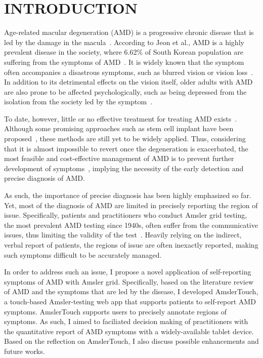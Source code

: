 \chapter{INTRODUCTION}

Age-related macular degeneration (AMD) is a progressive chronic disease that is led by the damage in the macula~\cite{lim2012age}. According to Jeon et al., AMD is a highly prevalent disease in the society, where 6.62\% of South Korean population are suffering from the symptoms of AMD~\cite{park2014age}. It is widely known that the symptom often accompanies a disastrous symptoms, such as blurred vision or vision loss~\cite{lim2012age}. In addition to its detrimental effects on the vision itself, older adults with AMD are also prone to be affected psychologically, such as being depressed from the isolation from the society led by the symptom~\cite{rovner2007preventing}.

To date, however, little or no effective treatment for treating AMD exists~\cite{wong2011prevention}. Although some promising approaches such as stem cell implant have been proposed~\cite{carr2013development}, these methods are still yet to be widely applied. Thus, considering that it is almost impossible to revert once the degeneration is exacerbated, the most feasible and cost-effective management of AMD is to prevent further development of symptoms~\cite{al2017recent}, implying the necessity of the early detection and precise diagnosis of AMD.

As such, the importance of precise diagnosis has been highly emphasized so far. Yet, most of the diagnosis of AMD are limited in precisely reporting the region of issue. Specifically, patients and practitioners who conduct Amsler grid testing, the most prevalent AMD testing since 1940s, often suffer from the communicative issues, thus limiting the validity of the test~\cite{schuchard1993validity}. Heavily relying on the indirect, verbal report of patients, the regions of issue are often inexactly reported, making such symptoms difficult to be accurately managed.

In order to address such an issue, I propose a novel application of self-reporting symptoms of AMD with Amsler grid. Specifically, based on the literature review of AMD and the symptoms that are led by the disease, I developed AmslerTouch, a touch-based Amsler-testing web app that supports patients to self-report AMD symptoms. AmslerTouch supports users to precisely annotate regions of symptoms. As such, I aimed to faciliated decision making of practitioners with the quantitative report of AMD symptoms with a widely-available tablet device. Based on the reflection on AmslerTouch, I also discuss possible enhancements and future works.
